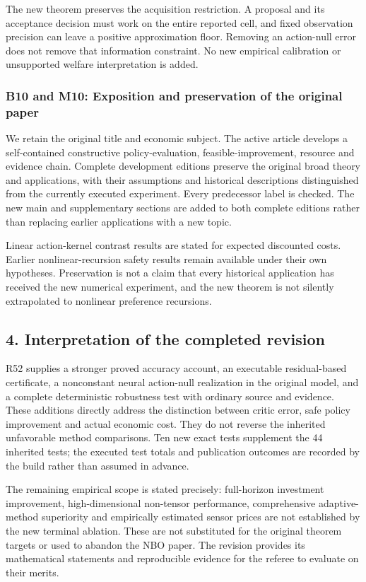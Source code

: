 \documentclass[ecta,nameyear,draft]{econsocart}
\begin{document}
The new theorem preserves the acquisition restriction. A proposal and
its acceptance decision must work on the entire reported cell, and fixed
observation precision can leave a positive approximation floor. Removing
an action-null error does not remove that information constraint. No new
empirical calibration or unsupported welfare interpretation is added.

\hypertarget{b10-and-m10-exposition-and-preservation-of-the-original-paper}{%
\subsubsection{B10 and M10: Exposition and preservation of the original
paper}\label{b10-and-m10-exposition-and-preservation-of-the-original-paper}}

We retain the original title and economic subject. The active article
develops a self-contained constructive policy-evaluation,
feasible-improvement, resource and evidence chain. Complete development
editions preserve the original broad theory and applications, with their
assumptions and historical descriptions distinguished from the currently
executed experiment. Every predecessor label is checked. The new main
and supplementary sections are added to both complete editions rather
than replacing earlier applications with a new topic.

Linear action-kernel contrast results are stated for expected discounted
costs. Earlier nonlinear-recursion safety results remain available under
their own hypotheses. Preservation is not a claim that every historical
application has received the new numerical experiment, and the new
theorem is not silently extrapolated to nonlinear preference recursions.

\hypertarget{interpretation-of-the-completed-revision}{%
\subsection{4. Interpretation of the completed
revision}\label{interpretation-of-the-completed-revision}}

R52 supplies a stronger proved accuracy account, an executable
residual-based certificate, a nonconstant neural action-null realization
in the original model, and a complete deterministic robustness test with
ordinary source and evidence. These additions directly address the
distinction between critic error, safe policy improvement and actual
economic cost. They do not reverse the inherited unfavorable method
comparisons. Ten new exact tests supplement the 44 inherited tests; the
executed test totals and publication outcomes are recorded by the build
rather than assumed in advance.

The remaining empirical scope is stated precisely: full-horizon
investment improvement, high-dimensional non-tensor performance,
comprehensive adaptive-method superiority and empirically estimated
sensor prices are not established by the new terminal ablation. These
are not substituted for the original theorem targets or used to abandon
the NBO paper. The revision provides its mathematical statements and
reproducible evidence for the referee to evaluate on their merits.
\end{document}
